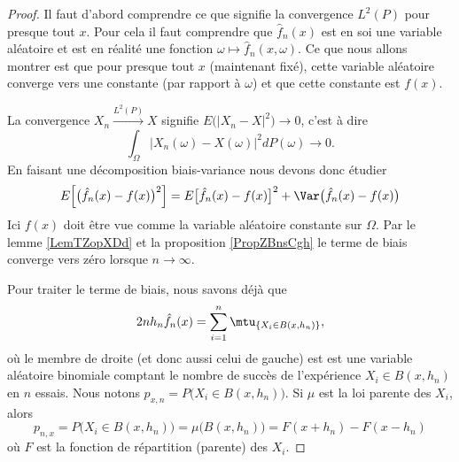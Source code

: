 \begin{proof}
    Il faut d'abord comprendre ce que signifie la convergence \( L^2(P)\) pour presque tout \( x\). Pour cela il faut comprendre que \( \hat f_n(x)\) est en soi une variable aléatoire et est en réalité une fonction \( \omega\mapsto \hat f_n(x,\omega)\). Ce que nous allons montrer est que pour presque tout \( x\) (maintenant fixé), cette variable aléatoire converge vers une constante (par rapport à \( \omega\)) et que cette constante est \( f(x)\).

    La convergence \( X_n\stackrel{L^2(P)}{\to}X\) signifie \( E\big( | X_n-X |^2 \big)\to 0\), c'est à dire
    \begin{equation}
        \int_{\Omega}\big| X_n(\omega)-X(\omega) \big|^2dP(\omega)\to 0.
    \end{equation}
    En faisant une décomposition biais-variance nous devons donc étudier
    \begin{equation}
        E\Big[ \big( \hat f_n(x)-f(x) \big)^2 \Big]=E\big[ \hat f_n(x)-f(x) \big]^2+\Var\big( \hat f_n(x)-f(x) \big)
    \end{equation}
    Ici \( f(x)\) doit être vue comme la variable aléatoire constante sur \( \Omega\). Par le lemme \ref{LemTZopXDd} et la proposition \ref{PropZBnsCgh} le terme de biais converge vers zéro lorsque \( n\to \infty\).

    Pour traiter le terme de biais, nous savons déjà que
    \begin{equation}
        2nh_n\hat f_n(x)=\sum_{i=1}^n\mtu_{\{ X_i\in B(x,h_n) \}},
    \end{equation}
    où le membre de droite (et donc aussi celui de gauche) est est une variable aléatoire binomiale comptant le nombre de succès de l'expérience \( X_i\in B(x,h_n)\) en \( n\) essais. Nous notons \( p_{x,n}=P\big( X_i\in B(x,h_n) \big)\). Si \( \mu\) est la loi parente des \( X_i\), alors
    \begin{equation}    \label{EqKBKrSHJ}
        p_{n,x}=P\big( X_i\in B(x,h_n) \big)=\mu\big( B(x,h_n) \big)=F(x+h_n)-F(x-h_n)
    \end{equation}
    où \( F\) est la fonction de répartition (parente) des \( X_i\).
    

\end{proof}
